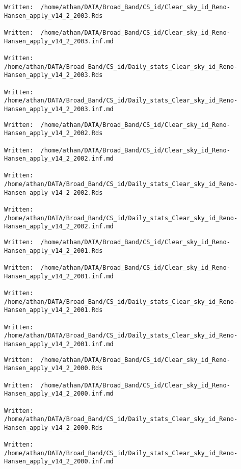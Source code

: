 \documentclass[
  10pt,
  a4paper,oneside]{article}
\begin{document}
\begin{verbatim}
Written:  /home/athan/DATA/Broad_Band/CS_id/Clear_sky_id_Reno-Hansen_apply_v14_2_2003.Rds 

Written:  /home/athan/DATA/Broad_Band/CS_id/Clear_sky_id_Reno-Hansen_apply_v14_2_2003.inf.md 

Written:  /home/athan/DATA/Broad_Band/CS_id/Daily_stats_Clear_sky_id_Reno-Hansen_apply_v14_2_2003.Rds 

Written:  /home/athan/DATA/Broad_Band/CS_id/Daily_stats_Clear_sky_id_Reno-Hansen_apply_v14_2_2003.inf.md 
\end{verbatim}

\begin{verbatim}
Written:  /home/athan/DATA/Broad_Band/CS_id/Clear_sky_id_Reno-Hansen_apply_v14_2_2002.Rds 

Written:  /home/athan/DATA/Broad_Band/CS_id/Clear_sky_id_Reno-Hansen_apply_v14_2_2002.inf.md 

Written:  /home/athan/DATA/Broad_Band/CS_id/Daily_stats_Clear_sky_id_Reno-Hansen_apply_v14_2_2002.Rds 

Written:  /home/athan/DATA/Broad_Band/CS_id/Daily_stats_Clear_sky_id_Reno-Hansen_apply_v14_2_2002.inf.md 
\end{verbatim}

\begin{verbatim}
Written:  /home/athan/DATA/Broad_Band/CS_id/Clear_sky_id_Reno-Hansen_apply_v14_2_2001.Rds 

Written:  /home/athan/DATA/Broad_Band/CS_id/Clear_sky_id_Reno-Hansen_apply_v14_2_2001.inf.md 

Written:  /home/athan/DATA/Broad_Band/CS_id/Daily_stats_Clear_sky_id_Reno-Hansen_apply_v14_2_2001.Rds 

Written:  /home/athan/DATA/Broad_Band/CS_id/Daily_stats_Clear_sky_id_Reno-Hansen_apply_v14_2_2001.inf.md 
\end{verbatim}

\begin{verbatim}
Written:  /home/athan/DATA/Broad_Band/CS_id/Clear_sky_id_Reno-Hansen_apply_v14_2_2000.Rds 

Written:  /home/athan/DATA/Broad_Band/CS_id/Clear_sky_id_Reno-Hansen_apply_v14_2_2000.inf.md 

Written:  /home/athan/DATA/Broad_Band/CS_id/Daily_stats_Clear_sky_id_Reno-Hansen_apply_v14_2_2000.Rds 

Written:  /home/athan/DATA/Broad_Band/CS_id/Daily_stats_Clear_sky_id_Reno-Hansen_apply_v14_2_2000.inf.md 
\end{verbatim}
\end{document}
